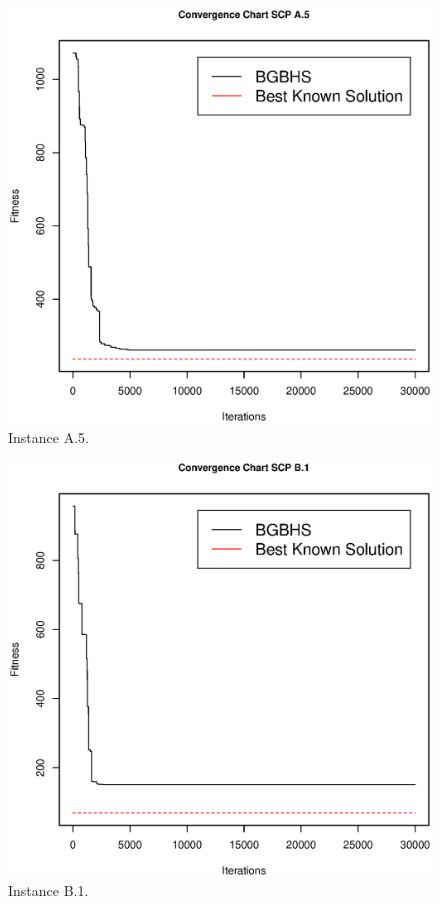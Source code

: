 \begin{figure}[]
\centering
\includegraphics[scale=.45]{Resultados/scpA5.eps}
\caption{Instance A.5.}
\label{fig:Instance.A.5}
\end{figure}

\begin{figure}[]
\centering
\includegraphics[scale=.45]{Resultados/scpB1.eps}
\caption{Instance B.1.}
\label{fig:Instance.B.1}
\end{figure}

